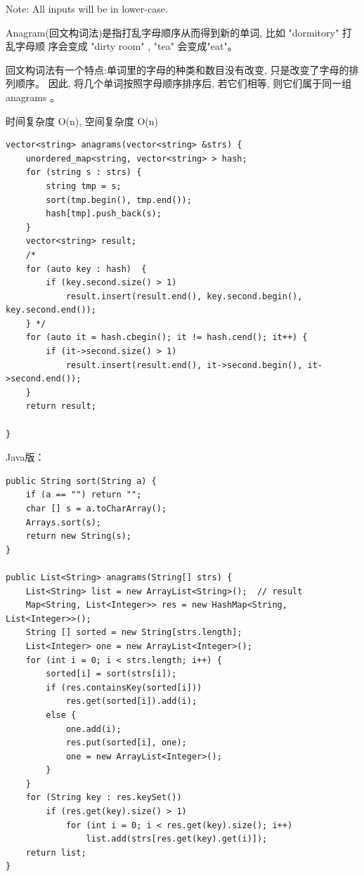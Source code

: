 \documentclass[12pt]{book}
\begin{document}
Note: All inputs will be in lower-case.

Anagram(回文构词法)是指打乱字母顺序从而得到新的单词, 比如 "dormitory" 打乱字母顺
序会变成 "dirty room" , "tea" 会变成"eat"。

回文构词法有一个特点:单词里的字母的种类和数目没有改变, 只是改变了字母的排列顺序。
因此, 将几个单词按照字母顺序排序后, 若它们相等, 则它们属于同一组 anagrams 。

时间复杂度 O(n), 空间复杂度 O(n)

\lstset{language=java,label= ,caption= ,numbers=none}
\begin{lstlisting}
vector<string> anagrams(vector<string> &strs) {
    unordered_map<string, vector<string> > hash;
    for (string s : strs) {
        string tmp = s;
        sort(tmp.begin(), tmp.end());
        hash[tmp].push_back(s);
    }
    vector<string> result;
    /*
    for (auto key : hash)  {
        if (key.second.size() > 1)
            result.insert(result.end(), key.second.begin(), key.second.end());
    } */
    for (auto it = hash.cbegin(); it != hash.cend(); it++) {
        if (it->second.size() > 1)
            result.insert(result.end(), it->second.begin(), it->second.end());
    }
    return result;

}
\end{lstlisting}

Java版：

\lstset{language=java,label= ,caption= ,numbers=none}
\begin{lstlisting}
public String sort(String a) {
    if (a == "") return "";
    char [] s = a.toCharArray();
    Arrays.sort(s);
    return new String(s);
}

public List<String> anagrams(String[] strs) {
    List<String> list = new ArrayList<String>();  // result
    Map<String, List<Integer>> res = new HashMap<String, List<Integer>>();
    String [] sorted = new String[strs.length];
    List<Integer> one = new ArrayList<Integer>();
    for (int i = 0; i < strs.length; i++) {
        sorted[i] = sort(strs[i]);
        if (res.containsKey(sorted[i])) 
            res.get(sorted[i]).add(i);
        else {
            one.add(i);
            res.put(sorted[i], one);
            one = new ArrayList<Integer>();
        }
    }
    for (String key : res.keySet()) 
        if (res.get(key).size() > 1) 
            for (int i = 0; i < res.get(key).size(); i++) 
                list.add(strs[res.get(key).get(i)]);
    return list;
}
\end{lstlisting}
\end{document}
